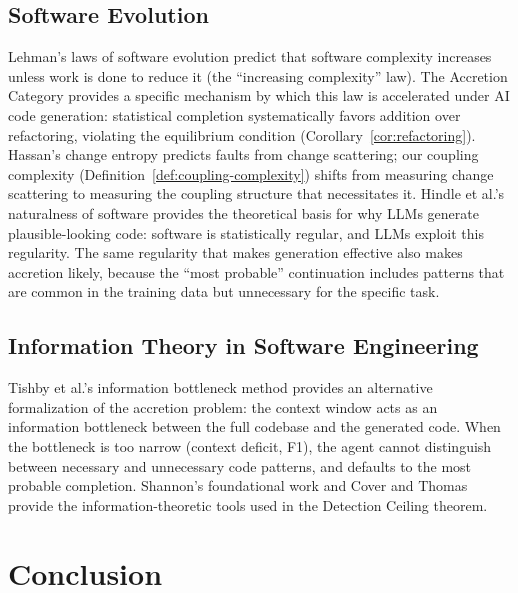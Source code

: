 \documentclass[11pt, a4paper, copyright]{googledeepmind}
\begin{document}
\subsection{Software Evolution}

Lehman's laws of software evolution \citep{Lehman1980} predict that software complexity increases unless work is done to reduce it (the ``increasing complexity'' law). The Accretion Category provides a specific mechanism by which this law is accelerated under AI code generation: statistical completion systematically favors addition over refactoring, violating the equilibrium condition (Corollary~\ref{cor:refactoring}). Hassan's change entropy \citep{hassan2009} predicts faults from change scattering; our coupling complexity (Definition~\ref{def:coupling-complexity}) shifts from measuring change scattering to measuring the coupling structure that necessitates it. Hindle et al.'s naturalness of software \citep{hindle2012naturalness} provides the theoretical basis for why LLMs generate plausible-looking code: software is statistically regular, and LLMs exploit this regularity. The same regularity that makes generation effective also makes accretion likely, because the ``most probable'' continuation includes patterns that are common in the training data but unnecessary for the specific task.

\subsection{Information Theory in Software Engineering}

Tishby et al.'s information bottleneck method \citep{tishby2000information} provides an alternative formalization of the accretion problem: the context window acts as an information bottleneck between the full codebase and the generated code. When the bottleneck is too narrow (context deficit, F1), the agent cannot distinguish between necessary and unnecessary code patterns, and defaults to the most probable completion. Shannon's foundational work \citep{shannon1948} and Cover and Thomas \citep{cover2006} provide the information-theoretic tools used in the Detection Ceiling theorem.


\section{Conclusion}
\end{document}
